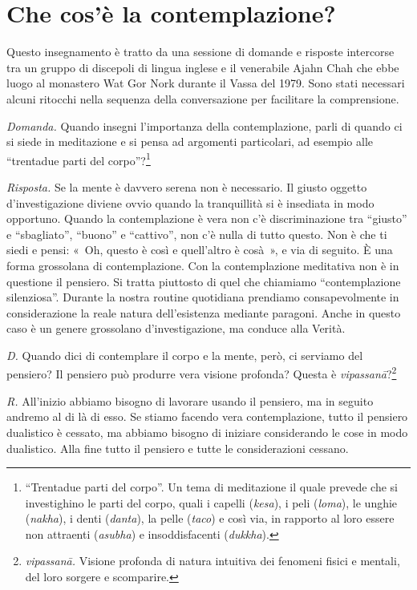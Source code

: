 \chapter{Che cos'è la contemplazione?}

\begin{openingQuote}
  \centering

  Questo insegnamento è tratto da una sessione di domande e risposte intercorse
  tra un gruppo di discepoli di lingua inglese e il venerabile Ajahn Chah che
  ebbe luogo al monastero Wat Gor Nork durante il Vassa del 1979. Sono stati
  necessari alcuni ritocchi nella sequenza della conversazione per facilitare la
  comprensione.
\end{openingQuote}

\emph{Domanda.} Quando insegni l'importanza della contemplazione, parli di
quando ci si siede in meditazione e si pensa ad argomenti particolari,
ad esempio alle ``trentadue parti del
corpo''?\footnote{``Trentadue parti del corpo''. Un
  tema di meditazione il quale prevede che si investighino le parti del
  corpo, quali i capelli (\emph{kesa}), i peli (\emph{loma}), le unghie
  (\emph{nakha}), i denti (\emph{danta}), la pelle (\emph{taco}) e così
  via, in rapporto al loro essere non attraenti (\emph{asubha}) e
  insoddisfacenti (\emph{dukkha}).}

\emph{Risposta.} Se la mente è davvero serena non è necessario. Il giusto
oggetto d'investigazione diviene ovvio quando la tranquillità si è
insediata in modo opportuno. Quando la contemplazione è vera non c'è
discriminazione tra ``giusto'' e ``sbagliato'', ``buono'' e ``cattivo'',
non c'è nulla di tutto questo. Non è che ti siedi e pensi: «~Oh, questo
è così e quell'altro è cosà~», e via di seguito. È una forma grossolana
di contemplazione. Con la contemplazione meditativa non è in questione
il pensiero. Si tratta piuttosto di quel che chiamiamo ``contemplazione
silenziosa''. Durante la nostra routine quotidiana prendiamo
consapevolmente in considerazione la reale natura dell'esistenza
mediante paragoni. Anche in questo caso è un genere grossolano
d'investigazione, ma conduce alla Verità.

\emph{D.} Quando dici di contemplare il corpo e la mente, però, ci serviamo
del pensiero? Il pensiero può produrre vera visione profonda? Questa è
\emph{vipassanā}?\footnote{\emph{vipassanā.} Visione
  profonda di natura intuitiva dei fenomeni fisici e mentali, del loro
  sorgere e scomparire.}

\emph{R.} All'inizio abbiamo bisogno di lavorare usando il pensiero, ma in
seguito andremo al di là di esso. Se stiamo facendo vera contemplazione,
tutto il pensiero dualistico è cessato, ma abbiamo bisogno di iniziare
considerando le cose in modo dualistico. Alla fine tutto il pensiero e
tutte le considerazioni cessano.

